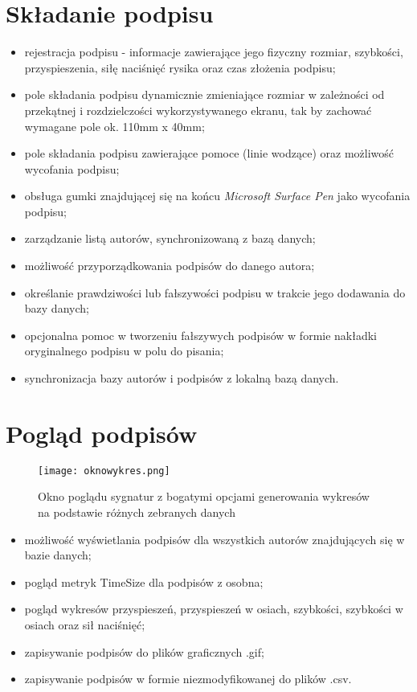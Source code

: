 \documentclass[notitlepage, oneside]{report}
\begin{document}
\section*{Składanie podpisu}
\begin{itemize}
  \item rejestracja podpisu - informacje zawierające jego fizyczny rozmiar, szybkości, przyspieszenia, siłę naciśnięć rysika oraz czas złożenia podpisu;
  \item pole składania podpisu dynamicznie zmieniające rozmiar w zależności od przekątnej i rozdzielczości wykorzystywanego ekranu, tak by zachować wymagane pole ok. 110mm x 40mm;
  \item pole składania podpisu zawierające pomoce (linie wodzące) oraz możliwość wycofania podpisu;
  \item obsługa gumki znajdującej się na końcu \textit{Microsoft Surface Pen} jako wycofania podpisu;
  \item zarządzanie listą autorów, synchronizowaną z bazą danych;
  \item możliwość przyporządkowania podpisów do danego autora;
  \item określanie prawdziwości lub fałszywości podpisu w trakcie jego dodawania do bazy danych;
  \item opcjonalna pomoc w tworzeniu fałszywych podpisów w formie nakładki oryginalnego podpisu w polu do pisania;
  \item synchronizacja bazy autorów i podpisów z lokalną bazą danych.
 \end{itemize}
 
 \section*{Pogląd podpisów}
 
 \begin{figure}
\centering
\texttt{[image: oknowykres.png]}
\caption{Okno poglądu sygnatur z bogatymi opcjami generowania wykresów na podstawie różnych zebranych danych}
\label{rys:Okno wykresów w aplikacji}
\end{figure}

\begin{itemize}
  \item możliwość wyświetlania podpisów dla wszystkich autorów znajdujących się w bazie danych;
  \item pogląd metryk TimeSize dla podpisów z osobna;
  \item pogląd wykresów przyspieszeń, przyspieszeń w osiach, szybkości, szybkości w osiach oraz sił naciśnięć;
  \item zapisywanie podpisów do plików graficznych .gif;
  \item zapisywanie podpisów w formie niezmodyfikowanej do plików .csv.
 \end{itemize}
\end{document}
